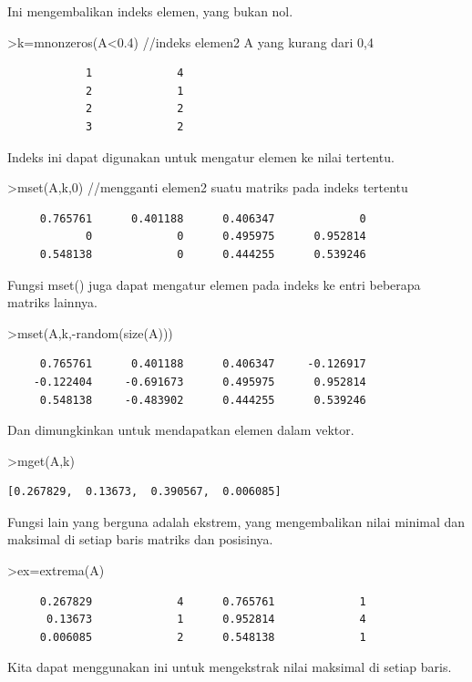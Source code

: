 \documentclass[
]{book}
\begin{document}
Ini mengembalikan indeks elemen, yang bukan nol.

\textgreater k=mnonzeros(A\textless0.4) //indeks elemen2 A yang kurang dari 0,4

\begin{verbatim}
            1             4 
            2             1 
            2             2 
            3             2 
\end{verbatim}

Indeks ini dapat digunakan untuk mengatur elemen ke nilai tertentu.

\textgreater mset(A,k,0) //mengganti elemen2 suatu matriks pada indeks tertentu

\begin{verbatim}
     0.765761      0.401188      0.406347             0 
            0             0      0.495975      0.952814 
     0.548138             0      0.444255      0.539246 
\end{verbatim}

Fungsi mset() juga dapat mengatur elemen pada indeks ke entri beberapa matriks lainnya.

\textgreater mset(A,k,-random(size(A)))

\begin{verbatim}
     0.765761      0.401188      0.406347     -0.126917 
    -0.122404     -0.691673      0.495975      0.952814 
     0.548138     -0.483902      0.444255      0.539246 
\end{verbatim}

Dan dimungkinkan untuk mendapatkan elemen dalam vektor.

\textgreater mget(A,k)

\begin{verbatim}
[0.267829,  0.13673,  0.390567,  0.006085]
\end{verbatim}

Fungsi lain yang berguna adalah ekstrem, yang mengembalikan nilai minimal dan maksimal di setiap baris matriks dan posisinya.

\textgreater ex=extrema(A)

\begin{verbatim}
     0.267829             4      0.765761             1 
      0.13673             1      0.952814             4 
     0.006085             2      0.548138             1 
\end{verbatim}

Kita dapat menggunakan ini untuk mengekstrak nilai maksimal di setiap baris.
\end{document}
